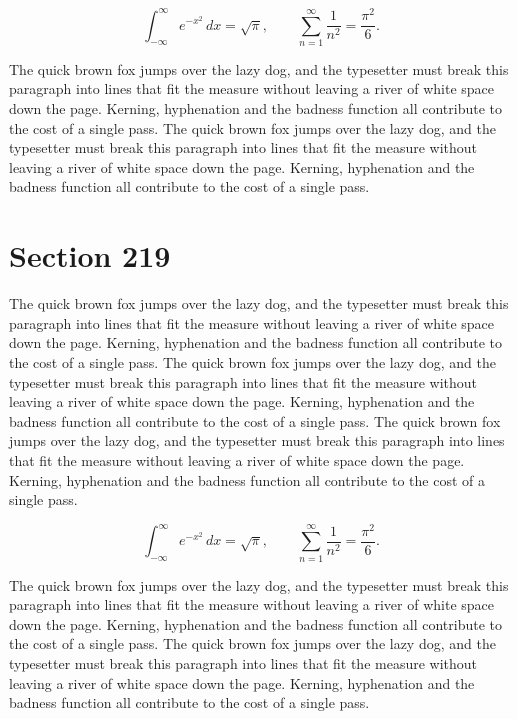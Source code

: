 \documentclass{article}
\begin{document}
\begin{equation}
\int_{-\infty}^{\infty} e^{-x^{2}}\,dx = \sqrt{\pi}, \qquad
\sum_{n=1}^{\infty} \frac{1}{n^{2}} = \frac{\pi^{2}}{6}.
\end{equation}

The quick brown fox jumps over the lazy dog, and the typesetter must break this paragraph into lines that fit the measure without leaving a river of white space down the page. Kerning, hyphenation and the badness function all contribute to the cost of a single pass. The quick brown fox jumps over the lazy dog, and the typesetter must break this paragraph into lines that fit the measure without leaving a river of white space down the page. Kerning, hyphenation and the badness function all contribute to the cost of a single pass. 
\section{Section 219}
The quick brown fox jumps over the lazy dog, and the typesetter must break this paragraph into lines that fit the measure without leaving a river of white space down the page. Kerning, hyphenation and the badness function all contribute to the cost of a single pass. The quick brown fox jumps over the lazy dog, and the typesetter must break this paragraph into lines that fit the measure without leaving a river of white space down the page. Kerning, hyphenation and the badness function all contribute to the cost of a single pass. The quick brown fox jumps over the lazy dog, and the typesetter must break this paragraph into lines that fit the measure without leaving a river of white space down the page. Kerning, hyphenation and the badness function all contribute to the cost of a single pass. 

\begin{equation}
\int_{-\infty}^{\infty} e^{-x^{2}}\,dx = \sqrt{\pi}, \qquad
\sum_{n=1}^{\infty} \frac{1}{n^{2}} = \frac{\pi^{2}}{6}.
\end{equation}

The quick brown fox jumps over the lazy dog, and the typesetter must break this paragraph into lines that fit the measure without leaving a river of white space down the page. Kerning, hyphenation and the badness function all contribute to the cost of a single pass. The quick brown fox jumps over the lazy dog, and the typesetter must break this paragraph into lines that fit the measure without leaving a river of white space down the page. Kerning, hyphenation and the badness function all contribute to the cost of a single pass. 
\end{document}
